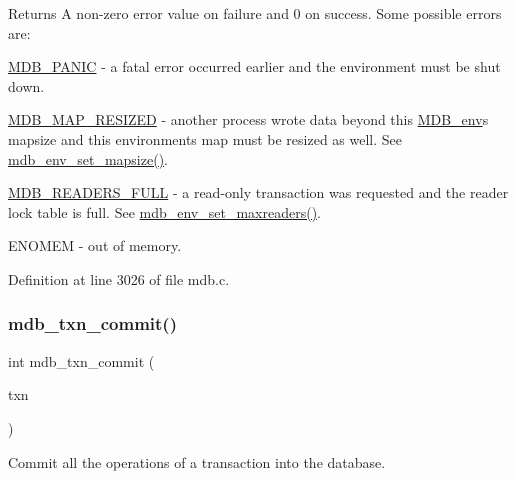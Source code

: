 \begin{DoxyReturn}{Returns}
A non-\/zero error value on failure and 0 on success. Some possible errors are\+: 
\begin{DoxyItemize}
\item \mbox{\hyperlink{group__errors_gae37b9aedcb3767faba3de8c1cf6d3473}{M\+D\+B\+\_\+\+P\+A\+N\+IC}} -\/ a fatal error occurred earlier and the environment must be shut down. 
\item \mbox{\hyperlink{group__errors_ga75c014faa4f02ffd234a5ee0e14baa92}{M\+D\+B\+\_\+\+M\+A\+P\+\_\+\+R\+E\+S\+I\+Z\+ED}} -\/ another process wrote data beyond this \mbox{\hyperlink{struct_m_d_b__env}{M\+D\+B\+\_\+env}}\textquotesingle{}s mapsize and this environment\textquotesingle{}s map must be resized as well. See \mbox{\hyperlink{group__mdb_ga4c47a5830f1071e578eaa1bbda2ae83e}{mdb\+\_\+env\+\_\+set\+\_\+mapsize()}}. 
\item \mbox{\hyperlink{group__errors_gadd6aaa88823710b97cc44f4f8c160799}{M\+D\+B\+\_\+\+R\+E\+A\+D\+E\+R\+S\+\_\+\+F\+U\+LL}} -\/ a read-\/only transaction was requested and the reader lock table is full. See \mbox{\hyperlink{group__mdb_gae687966c24b790630be2a41573fe40e2}{mdb\+\_\+env\+\_\+set\+\_\+maxreaders()}}. 
\item E\+N\+O\+M\+EM -\/ out of memory. 
\end{DoxyItemize}
\end{DoxyReturn}


Definition at line 3026 of file mdb.\+c.

\mbox{\label{group__mdb_ga846fbd6f46105617ac9f4d76476f6597}} 
\subsubsection{\texorpdfstring{mdb\+\_\+txn\+\_\+commit()}{mdb\_txn\_commit()}}
{\footnotesize\ttfamily int mdb\+\_\+txn\+\_\+commit (\begin{DoxyParamCaption}\item[{\mbox{\hyperlink{struct_m_d_b__txn}{M\+D\+B\+\_\+txn}} $\ast$}]{txn }\end{DoxyParamCaption})}



Commit all the operations of a transaction into the database. 

